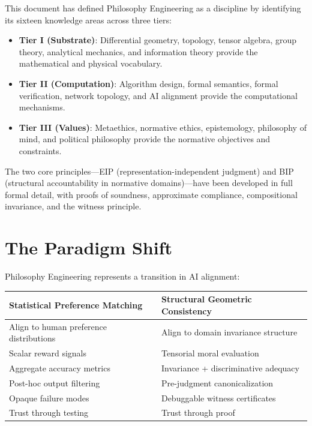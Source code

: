\documentclass[12pt,letterpaper]{article}
\theoremstyle{definition}
\theoremstyle{plain}
\begin{document}
This document has defined Philosophy Engineering as a discipline by identifying its sixteen knowledge areas across three tiers:

\begin{itemize}
    \item \textbf{Tier I (Substrate)}: Differential geometry, topology, tensor algebra, group theory, analytical mechanics, and information theory provide the mathematical and physical vocabulary.
    \item \textbf{Tier II (Computation)}: Algorithm design, formal semantics, formal verification, network topology, and AI alignment provide the computational mechanisms.
    \item \textbf{Tier III (Values)}: Metaethics, normative ethics, epistemology, philosophy of mind, and political philosophy provide the normative objectives and constraints.
\end{itemize}

The two core principles---EIP (representation-independent judgment) and BIP (structural accountability in normative domains)---have been developed in full formal detail, with proofs of soundness, approximate compliance, compositional invariance, and the witness principle.

\section{The Paradigm Shift}

Philosophy Engineering represents a transition in AI alignment:

\begin{center}
\renewcommand{\arraystretch}{1.3}
\begin{tabular}{p{6cm} p{6cm}}
\toprule
\textbf{Statistical Preference Matching} & \textbf{Structural Geometric Consistency} \\
\midrule
Align to human preference distributions & Align to domain invariance structure \\
Scalar reward signals & Tensorial moral evaluation \\
Aggregate accuracy metrics & Invariance + discriminative adequacy \\
Post-hoc output filtering & Pre-judgment canonicalization \\
Opaque failure modes & Debuggable witness certificates \\
Trust through testing & Trust through proof \\
\bottomrule
\end{tabular}
\end{center}
\end{document}
